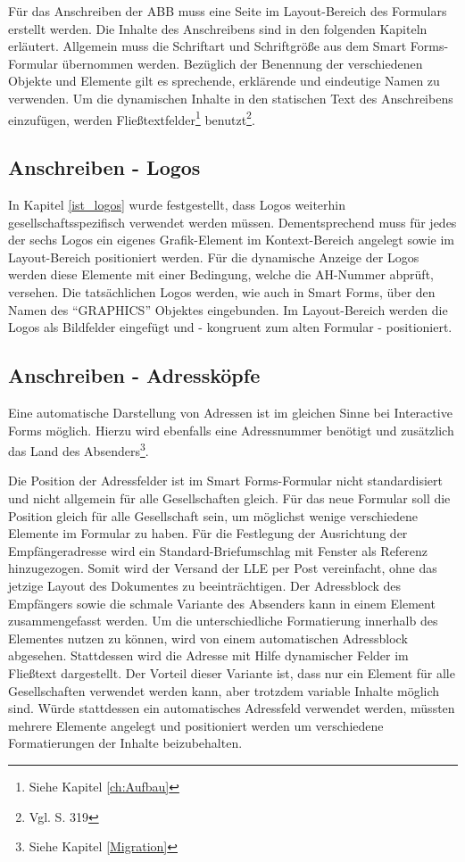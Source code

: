 Für das Anschreiben der ABB muss eine Seite im Layout-Bereich des Formulars erstellt werden. Die Inhalte des Anschreibens sind in den folgenden Kapiteln erläutert. Allgemein muss die Schriftart und Schriftgröße aus dem Smart Forms-Formular übernommen werden. Bezüglich der Benennung der verschiedenen Objekte und Elemente gilt es sprechende, erklärende und eindeutige Namen zu verwenden. Um die dynamischen Inhalte in den statischen Text des Anschreibens einzufügen, werden Fließtextfelder\footnote{Siehe Kapitel \ref{ch:Aufbau}} benutzt\footnote{Vgl. \cite{Hauser.2015} S. 319}.

\subsection{Anschreiben - Logos}

In Kapitel \ref{ist_logos} wurde festgestellt, dass Logos weiterhin gesellschaftsspezifisch verwendet werden müssen. Dementsprechend muss für jedes der sechs Logos ein eigenes Grafik-Element im Kontext-Bereich angelegt sowie im Layout-Bereich positioniert werden. Für die dynamische Anzeige der Logos werden diese Elemente mit einer Bedingung, welche die \ac{AH}-Nummer abprüft, versehen. Die tatsächlichen Logos werden, wie auch in Smart Forms, über den Namen des "`GRAPHICS"' Objektes eingebunden. Im Layout-Bereich werden die Logos als Bildfelder eingefügt und - kongruent zum alten Formular - positioniert. 

\subsection{Anschreiben - Adressköpfe}

Eine automatische Darstellung von Adressen ist im gleichen Sinne bei Interactive Forms möglich. Hierzu wird ebenfalls eine Adressnummer benötigt und zusätzlich das Land des Absenders\footnote{Siehe Kapitel \ref{Migration}}.

Die Position der Adressfelder ist im Smart Forms-Formular nicht standardisiert und nicht allgemein für alle Gesellschaften gleich. Für das neue Formular soll die Position gleich für alle Gesellschaft sein, um möglichst wenige verschiedene Elemente im Formular zu haben. Für die Festlegung der Ausrichtung der Empfängeradresse wird ein Standard-Briefumschlag mit Fenster als Referenz hinzugezogen. Somit wird der Versand der \ac{LLE} per Post vereinfacht, ohne das jetzige Layout des Dokumentes zu beeinträchtigen. Der Adressblock des Empfängers sowie die schmale Variante des Absenders kann in einem Element zusammengefasst werden. Um die unterschiedliche Formatierung innerhalb des Elementes nutzen zu können, wird von einem automatischen Adressblock abgesehen. Stattdessen wird die Adresse mit Hilfe dynamischer Felder im Fließtext dargestellt. Der Vorteil dieser Variante ist, dass nur ein Element für alle Gesellschaften verwendet werden kann, aber trotzdem variable Inhalte möglich sind.
 Würde stattdessen ein automatisches Adressfeld verwendet werden, müssten mehrere Elemente angelegt und positioniert werden um verschiedene Formatierungen der Inhalte beizubehalten.
 
